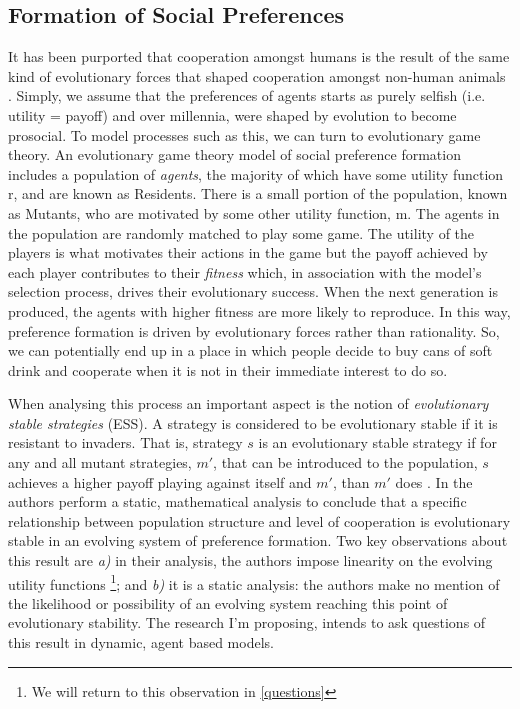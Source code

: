 \documentclass[11pt]{article}
\newcommand*{\np}{\par\noindent\newline}
\begin{document}
\subsection{Formation of Social Preferences}\label{formation_social_preferences}
It has been purported that cooperation amongst humans is the result of the same
kind of evolutionary forces that shaped cooperation amongst non-human animals
\cite{silk_evolution_2016}. Simply, we assume that the preferences of
agents starts as purely selfish (i.e. utility = payoff) and over millennia,
were shaped by evolution to become prosocial. To model processes such as this,
we can turn to evolutionary game theory. An evolutionary game theory model of
social preference formation includes a population of \textit{agents}, the
majority of which have some utility function r, and are known as Residents.
There is a small portion of the population, known as Mutants, who are
motivated by some other utility function, m. The agents in the population are
randomly matched to play some game. The utility of the players is
what motivates their actions in the game but the payoff achieved by each
player contributes to their \textit{fitness} which, in association with the
model's selection process, drives their evolutionary success. When the next
generation is produced, the agents with higher fitness are more likely to
reproduce. In this way, preference formation is driven by evolutionary
forces rather than rationality. So, we can potentially end up in a place in
which people decide to buy cans of soft drink and cooperate when it is not in
their immediate interest to do so.

\np When analysing this process an important aspect is the notion of
\textit{evolutionary stable strategies} (ESS). A strategy is considered to be
evolutionary stable if it is resistant to invaders. That is, strategy $s$ is an
evolutionary stable strategy if for any and all mutant strategies, $m'$, that
can be introduced to the population, $s$ achieves a higher payoff playing
against itself and $m'$, than $m'$ does \cite{shoham_multiagent_2008}. In
\cite{alger_homo_2013} the authors perform a static, mathematical analysis to
conclude that a specific relationship between population structure and level of
cooperation is evolutionary stable in an evolving system of preference
formation. Two key observations about this result are \textit{a)} in their
analysis, the authors impose linearity on the evolving utility functions
\footnote{We will return to this observation in \ref{questions}}; and
\textit{b)} it is a static analysis: the authors make no mention of the
likelihood or possibility of an evolving system reaching this point of
evolutionary stability. The research I'm proposing, intends to ask questions of this result in dynamic, agent based models.
\end{document}
